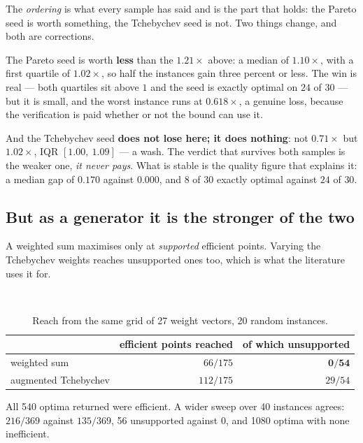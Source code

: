 \documentclass[11pt,a4paper]{article}
\begin{document}
\noindent
The \emph{ordering} is what every sample has said and is the part that holds:
the Pareto seed is worth something, the Tchebychev seed is not.  Two things
change, and both are corrections.

The Pareto seed is worth \textbf{less} than the $1.21\times$ above: a median of
$1.10\times$, with a first quartile of $1.02\times$, so half the instances gain
three percent or less.  The win is real --- both quartiles sit above $1$ and
the seed is exactly optimal on $24$ of $30$ --- but it is small, and the worst
instance runs at $0.618\times$, a genuine loss, because the verification is
paid whether or not the bound can use it.

And the Tchebychev seed \textbf{does not lose here; it does nothing}: not
$0.71\times$ but $1.02\times$, IQR $[1.00,\ 1.09]$ --- a wash.  The verdict
that survives both samples is the weaker one, \emph{it never pays}.  What is
stable is the quality figure that explains it: a median gap of $0.170$ against
$0.000$, and $8$ of $30$ exactly optimal against $24$ of $30$.

\subsection{But as a generator it is the stronger of the two}

A weighted sum maximises only at \emph{supported} efficient points.  Varying
the Tchebychev weights reaches unsupported ones too, which is what the
literature uses it for.

\begin{center}
\\[2pt]
\end{center}

\begin{table}[h]
\centering
\caption{Reach from the same grid of 27 weight vectors, 20 random instances.}
\begin{tabular}{lrr}
\toprule
 & efficient points reached & of which unsupported \\
\midrule
weighted sum         & $66 / 175$  & $\mathbf{0 / 54}$ \\
augmented Tchebychev & $112 / 175$ & $29 / 54$ \\
\bottomrule
\end{tabular}
\end{table}

\noindent
All 540 optima returned were efficient.  A wider sweep over 40 instances
agrees: $216/369$ against $135/369$, 56 unsupported against 0, and 1080 optima
with none inefficient.
\end{document}

